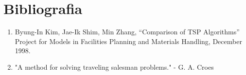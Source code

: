 \documentclass{article}
\begin{document}
\section{Bibliografia}


\begin{enumerate}
\item Byung-In Kim, Jae-Ik Shim, Min Zhang, “Comparison of TSP Algorithms” Project for Models in Facilities Planning and Materials Handling, December 1998. %
\item "A method for solving traveling salesman problems." - G. A. Croes
\end{enumerate}
\end{document}
